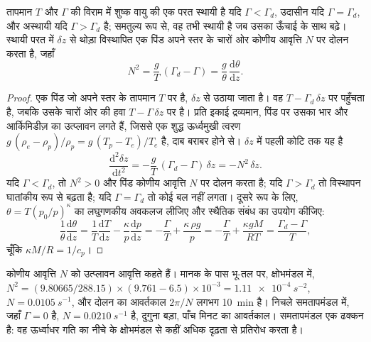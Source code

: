 \begin{theorem}[स्थैतिक स्थिरता का मानदंड]\label{thm:b1:fluid-envelopes-structure:stability}
तापमान $T$ और  $\Gamma$ की विराम में शुष्क वायु की एक परत स्थायी है यदि $\Gamma < \Gamma_d$, उदासीन यदि $\Gamma = \Gamma_d$, और अस्थायी यदि $\Gamma > \Gamma_d$ है; समतुल्य रूप से, वह तभी स्थायी है जब उसका  ऊँचाई के साथ बढ़े। स्थायी परत में $\delta z$ से थोड़ा विस्थापित एक पिंड अपने स्तर के चारों ओर कोणीय आवृत्ति $N$ पर दोलन करता है, जहाँ
\[
  N^2 = \frac{g}{T}\,(\Gamma_d - \Gamma) = \frac{g}{\theta}\,\frac{\mathrm d\theta}{\mathrm dz}.
\]
\end{theorem}

\begin{proof}
एक पिंड जो अपने स्तर के तापमान $T$ पर है, $\delta z$ से उठाया जाता है। वह $T - \Gamma_d\,\delta z$ पर पहुँचता है, जबकि उसके चारों ओर की हवा $T - \Gamma\,\delta z$ पर है। प्रति इकाई द्रव्यमान, पिंड पर उसका भार और आर्किमिडीज़ का उत्प्लावन लगते हैं, जिससे एक शुद्ध ऊर्ध्वमुखी त्वरण $g\,(\rho_e - \rho_p)/\rho_p = g\,(T_p - T_e)/T_e$ है, दाब बराबर होने से। $\delta z$ में पहली कोटि तक यह है
\[
  \frac{\mathrm d^2 \delta z}{\mathrm dt^2} = -\frac{g}{T}\,(\Gamma_d - \Gamma)\,\delta z = -N^2\,\delta z .
\]
यदि $\Gamma < \Gamma_d$, तो $N^2 > 0$ और पिंड कोणीय आवृत्ति $N$ पर दोलन करता है; यदि $\Gamma > \Gamma_d$ तो विस्थापन घातांकीय रूप से बढ़ता है; यदि $\Gamma = \Gamma_d$ तो कोई बल नहीं लगता। दूसरे रूप के लिए, $\theta = T (p_0/p)^{\kappa}$ का लघुगणकीय अवकलज लीजिए और स्थैतिक संबंध का उपयोग कीजिए:
\[
  \frac{1}{\theta}\frac{\mathrm d\theta}{\mathrm dz} = \frac{1}{T}\frac{\mathrm dT}{\mathrm dz}
  - \frac{\kappa}{p}\frac{\mathrm dp}{\mathrm dz} = -\frac{\Gamma}{T} + \frac{\kappa\,\rho g}{p}
  = -\frac{\Gamma}{T} + \frac{\kappa g M}{RT} = \frac{\Gamma_d - \Gamma}{T},
\]
चूँकि $\kappa M/R = 1/c_p$।
\end{proof}

कोणीय आवृत्ति $N$ को उत्प्लावन आवृत्ति कहते हैं। मानक के पास भू-तल पर, क्षोभमंडल में, $N^2 = (9.80665/288.15) \times (9.761 -
6.5)\times10^{-3} = \qty{1.11e-4}{s^{-2}}$, $N = \qty{0.0105}{s^{-1}}$, और दोलन का आवर्तकाल $2\pi/N$ लगभग \qty{10}{min} है। निचले समतापमंडल में, जहाँ $\Gamma = 0$ है, $N = \qty{0.0210}{s^{-1}}$ है, दुगुना बड़ा, पाँच मिनट का आवर्तकाल। समतापमंडल एक ढक्कन है: वह ऊर्ध्वाधर गति का नीचे के क्षोभमंडल से कहीं अधिक दृढ़ता से प्रतिरोध करता है।

